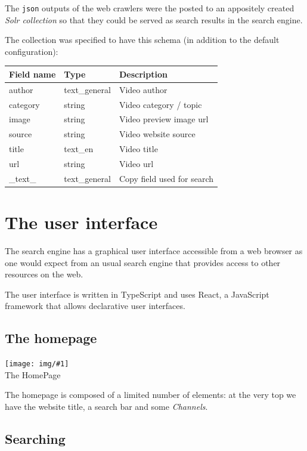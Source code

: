 \documentclass[12pt]{exam}
\newcommand{\pic}[2]{{
\begin{center}
\texttt{[image: img/\#1]} \\
{#2}
\end{center}
}}
\begin{document}
The \texttt{json} outputs of the web crawlers were the posted to
an appositely created \textit{Solr collection} so that they could be served
as search results in the search engine.

The collection was specified to have this schema (in addition to the default
configuration):

\begin{center}
\begin{tabular}{lll}
Field name & Type          & Description                \\\hline
author     & text\_general & Video author               \\
category   & string        & Video category / topic     \\
image      & string        & Video preview image url    \\
source     & string        & Video website source       \\
title      & text\_en      & Video title                \\
url        & string        & Video url                  \\\hline
\_text\_   & text\_general & Copy field used for search \\
\end{tabular}
\end{center}

\newpage

\section{The user interface}

The search engine has a graphical user interface accessible from a web
browser as one would expect from an usual search engine that provides
access to other resources on the web.

The user interface is written in TypeScript and uses React, a JavaScript
framework that allows declarative user interfaces.

\subsection{The homepage}

\pic{se_home}{The HomePage}

The homepage is composed of a limited number of elements: at the very
top we have the website title, a search bar and some \textit{Channels}.

\subsection{Searching}
\end{document}
